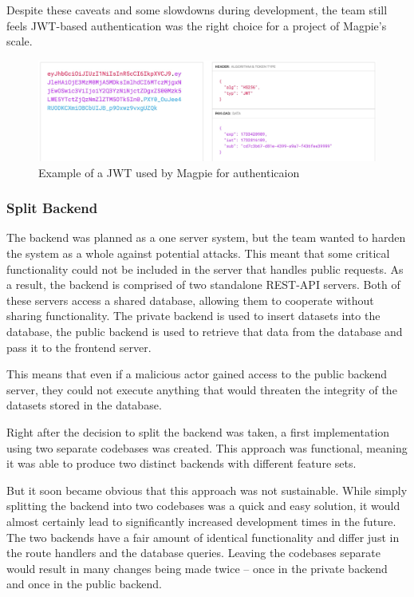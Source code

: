 Despite these caveats and some slowdowns during development, the team still
feels JWT-based authentication was the right choice for a project of Magpie's
scale.

\begin{figure}[htbp]
  \centering{}
  \includegraphics[width=\textwidth]{images/jwt.png}
  \caption{Example of a JWT used by Magpie for authenticaion}
  \label{fig:jwt_example}
\end{figure}

\subsubsection{Split Backend}
The backend was planned as a one server system, but the team wanted to harden
the system as a whole against potential attacks. This meant that some critical
functionality could not be included in the server that handles public requests.
As a result, the backend is comprised of two standalone REST-API servers. Both
of these servers access a shared database, allowing them to cooperate without
sharing functionality. The private backend is used to insert datasets into the
database, the public backend is used to retrieve that data from the database and
pass it to the frontend server.

This means that even if a malicious actor gained access to the public backend
server, they could not execute anything that would threaten the integrity of the
datasets stored in the database.

Right after the decision to split the backend was taken, a first implementation
using two separate codebases was created. This approach was functional, meaning
it was able to produce two distinct backends with different feature sets.

But it soon became obvious that this approach was not sustainable. While simply
splitting the backend into two codebases was a quick and easy solution, it would
almost certainly lead to significantly increased development times in the
future. The two backends have a fair amount of identical functionality and
differ just in the route handlers and the database queries. Leaving the
codebases separate would result in many changes being made twice -- once in the
private backend and once in the public backend.

